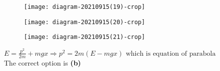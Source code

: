 \begin{enumerate}
\begin{tasks}
	\task[\textbf{B.}]\begin{figure}[H]
		\centering
		\texttt{[image: diagram-20210915(19)-crop]}
	\end{figure}
	\task[\textbf{C.}]\begin{figure}[H]
		\centering
		\texttt{[image: diagram-20210915(20)-crop]}
	\end{figure}
	\task[\textbf{D.}]\begin{figure}[H]
		\centering
		\texttt{[image: diagram-20210915(21)-crop]}
	\end{figure}
\end{tasks}
\begin{answer}
	$E=\frac{p^{2}}{2 m}+m g x \Rightarrow p^{2}=2 m(E-m g x) \text { which is equation of parabola }$\\
	The correct option is \textbf{(b)}
\end{answer}
\end{enumerate}